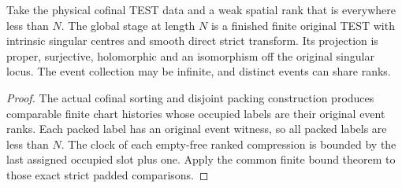\begin{theorem}
\label{hir:g8-uniformly-bounded-weak-rank-finite-endpoint}
\leanok
Take the physical cofinal TEST data and a weak spatial rank
that is everywhere less than \(N\). The global stage at length
\(N\) is a finished finite original TEST with intrinsic singular
centres and smooth direct strict transform. Its projection is
proper, surjective, holomorphic and an isomorphism off the original
singular locus. The event collection may be infinite, and distinct
events can share ranks.
\end{theorem}
\begin{proof}
The actual cofinal sorting and disjoint packing construction
produces comparable finite chart histories whose occupied labels
are their original event ranks. Each packed label has an original
event witness, so all packed labels are less than \(N\). The
clock of each empty-free ranked compression is bounded by the
last assigned occupied slot plus one. Apply the common finite
bound theorem to those exact strict padded comparisons.
\end{proof}

